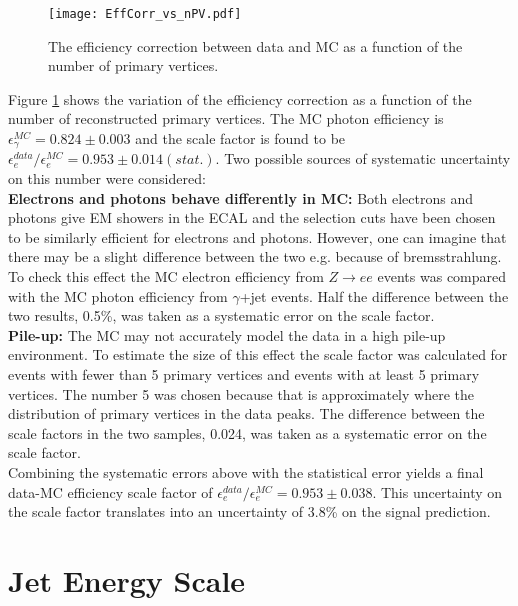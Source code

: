 \begin{figure}
\begin{center}
\texttt{[image: EffCorr\_vs\_nPV.pdf]}
\end{center}
\caption{The efficiency correction between data and MC as a function of the
number of primary vertices.}
\label{fig:EffCorr_vs_nPV}
\end{figure}

Figure \ref{fig:EffCorr_vs_nPV} shows the variation of the efficiency correction 
as a function of the number of reconstructed primary vertices. The MC photon 
efficiency is $\epsilon_{\gamma}^{MC} = 0.824\pm0.003$ and the scale factor is 
found to be $\epsilon_{e}^{data}/\epsilon_{e}^{MC} = 0.953\pm 0.014(stat.)$. Two 
possible sources of systematic uncertainty on this number were considered: \\

{\bf Electrons and photons behave differently in MC:} Both electrons and photons
give EM showers in the ECAL and the selection cuts have been chosen to be
similarly efficient for electrons and photons. However, one can imagine that
there may be a slight difference between the two e.g. because of bremsstrahlung.
To check this effect the MC electron efficiency from $Z\rightarrow ee$ events
was compared with the MC photon efficiency from $\gamma$+jet events. Half the
difference between the two results, 0.5\unit{\%}, was taken as a systematic 
error on the scale factor. \\

{\bf Pile-up:} The MC may not accurately model the data in a high pile-up
environment. To estimate the size of this effect the scale factor was calculated
for events with fewer than 5 primary vertices and events with at least 5 primary
vertices. The number 5 was chosen because that is approximately where the 
distribution of primary vertices in the data peaks. The difference between the
scale factors in the two samples, 0.024, was taken as a systematic error on the 
scale factor. \\

Combining the systematic errors above with the statistical error yields a final
data-MC efficiency scale factor of $\epsilon_{e}^{data}/\epsilon_{e}^{MC} =
0.953\pm0.038$. This uncertainty on the scale factor translates into an 
uncertainty of 3.8\% on the signal prediction.

\section{Jet Energy Scale}

